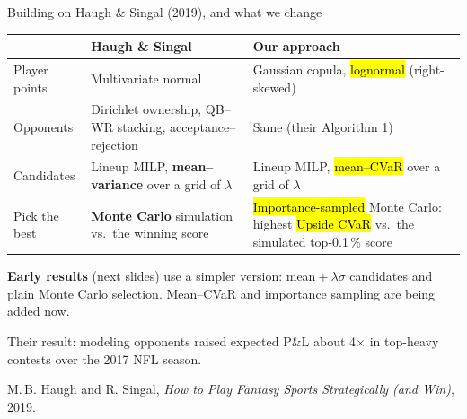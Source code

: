 \begin{frame}{Building on Haugh \& Singal (2019), and what we change}
  \centering\small
  \begin{tabular}{@{}p{}p{}p{}@{}}
    \toprule
    & \textbf{Haugh \& Singal} & \textbf{Our approach} \\
    \midrule
    Player points & Multivariate normal
      & Gaussian copula, \hl{lognormal} (right-skewed) \\[2pt]
    Opponents & Dirichlet ownership, QB--WR stacking, acceptance--rejection
      & Same (their Algorithm 1) \\[2pt]
    Candidates & Lineup MILP, \textbf{mean--variance} over a grid of $\lambda$
      & Lineup MILP, \hl{mean--CVaR} over a grid of $\lambda$ \\[2pt]
    Pick the best & \textbf{Monte Carlo} simulation vs.\ the winning score
      & \hl{Importance-sampled} Monte Carlo: highest \hl{Upside CVaR} vs.\ the simulated
        top-0.1\,\% score \\
    \bottomrule
  \end{tabular}
  \vspace{0.5em}

  {\footnotesize\color{navy} \textbf{Early results} (next slides) use a simpler version:
  mean${}+\lambda\sigma$ candidates and plain Monte Carlo selection. Mean--CVaR and importance
  sampling are being added now.\par}
  \vfill
  {\footnotesize Their result: modeling opponents raised expected P\&L about 4$\times$ in
  top-heavy contests over the 2017 NFL season.\par}
  {\scriptsize M.\,B. Haugh and R. Singal, \emph{How to Play Fantasy Sports Strategically
  (and Win)}, 2019.\par}
\end{frame}

